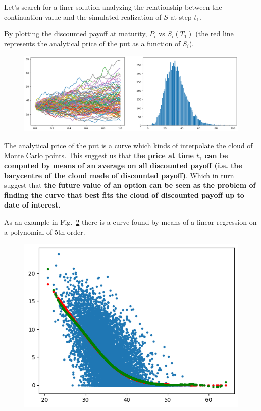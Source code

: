 \documentclass[12pt,a4paper]{article}
\begin{document}
Let's search for a finer solution analyzing the relationship between the continuation value and the simulated realization of $S$ at step $t_1$. 

By plotting the discounted payoff at maturity, $P_i$ vs $S_i(T_1)$ (the red line represents the analytical price of the put as a function of $S_i$).

\begin{figure}[htbp]
	\begin{center}
		\includegraphics[width=0.8\linewidth]{addons/lsm_paths}
	\end{center}
	\label{fig:lsm_paths}
\end{figure}

The analytical price of the put is a curve which kinds of interpolate the cloud of Monte Carlo points. This suggest us that
\textbf{the price at time $t_1$ can be computed by means of an average on all discounted payoff (i.e. the barycentre of the cloud made of discounted payoff)}.
Which in turn suggest that \textbf{the future value of an option can be seen as the problem of finding the curve that best fits the cloud of discounted payoff up to date of interest.}

As an example in Fig.~\ref{fig:continuation_function} there is a curve found by means of a linear regression on a polynomial of 5th order.

\begin{figure}[htbp]
	\begin{center}
		\includegraphics[width=0.5\linewidth]{addons/continuation_function}
	\end{center}
	\label{fig:continuation_function}
\end{figure}
\end{document}
